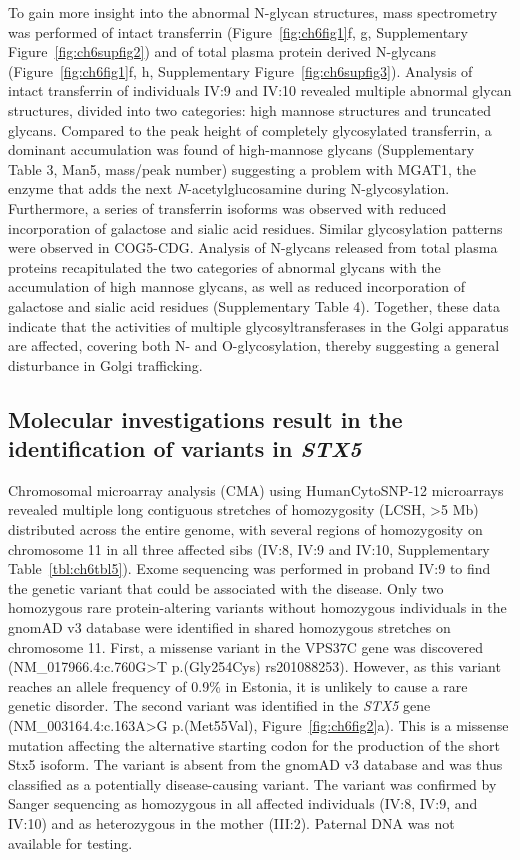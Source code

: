 To gain more insight into the abnormal N-glycan structures, mass spectrometry was performed of intact transferrin (Figure~\ref{fig:ch6fig1}f, g, Supplementary Figure~\ref{fig:ch6supfig2}) and of total plasma protein derived N-glycans (Figure~\ref{fig:ch6fig1}f, h, Supplementary Figure~\ref{fig:ch6supfig3}). Analysis of intact transferrin of individuals IV:9 and IV:10 revealed multiple abnormal glycan structures, divided into two categories: high mannose structures and truncated glycans. Compared to the peak height of completely glycosylated transferrin, a dominant accumulation was found of high-mannose glycans (Supplementary Table 3, Man5, mass/peak number) suggesting a problem with MGAT1, the enzyme that adds the next \emph{N}-acetylglucosamine during N-glycosylation. Furthermore, a series of transferrin isoforms was observed with reduced incorporation of galactose and sialic acid residues. Similar glycosylation patterns were observed in COG5-CDG\cite{fung_cog5-cdg_2012,paesold-burda_deficiency_2009,palmigiano_maldi-ms_2017,rymen_cog5-cdg_2012}. Analysis of N-glycans released from total plasma proteins recapitulated the two categories of abnormal glycans with the accumulation of high mannose glycans, as well as reduced incorporation of galactose and sialic acid residues (Supplementary Table 4). Together, these data indicate that the activities of multiple glycosyltransferases in the Golgi apparatus are affected, covering both N- and O-glycosylation, thereby suggesting a general disturbance in Golgi trafficking.   

\subsection{Molecular investigations result in the identification of variants in \emph{STX5}}

Chromosomal microarray analysis (CMA) using HumanCytoSNP-12 microarrays revealed multiple long contiguous stretches of homozygosity (LCSH, >5 Mb) distributed across the entire genome, with several regions of homozygosity on chromosome 11 in all three affected sibs (IV:8, IV:9 and IV:10, Supplementary Table~\ref{tbl:ch6tbl5}). Exome sequencing was performed in proband IV:9 to find the genetic variant that could be associated with the disease. Only two homozygous rare protein-altering variants without homozygous individuals in the gnomAD v3 database were identified in shared homozygous stretches on chromosome 11. First, a missense variant in the VPS37C gene was discovered (NM\_017966.4:c.760G>T p.(Gly254Cys) rs201088253). However, as this variant reaches an allele frequency of 0.9\% in Estonia, it is unlikely to cause a rare genetic disorder. The second variant was identified in the \emph{STX5} gene (NM\_003164.4:c.163A>G p.(Met55Val), Figure~\ref{fig:ch6fig2}a). This is a missense mutation affecting the alternative starting codon for the production of the short Stx5 isoform. The variant is absent from the gnomAD v3 database and was thus classified as a potentially disease-causing variant. The variant was confirmed by Sanger sequencing as homozygous in all affected individuals (IV:8, IV:9, and IV:10) and as heterozygous in the mother (III:2). Paternal DNA was not available for testing.

